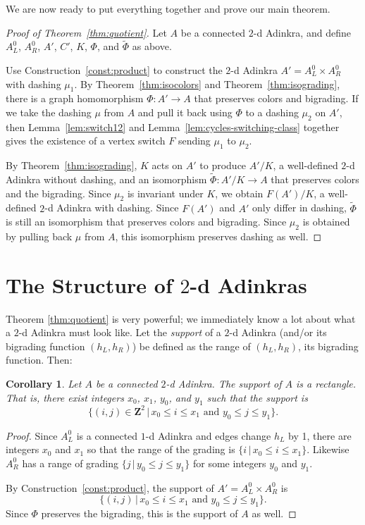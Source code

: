 \documentclass[12pt,twoside,singlespace]{article}
\numberwithin{equation}{section}
\newtheorem{cor}[equation]{Corollary}
\theoremstyle{definition}
\newcommand{\ZZ}{\mathbf{Z}}
\begin{document}
We are now ready to put everything together and prove our main theorem.

\begin{proof}[Proof of Theorem~\ref{thm:quotient}]
Let $A$ be a connected $2$-d Adinkra, and define $A_L^0$, $A_R^0$, $A'$, $C'$, $K$, $\Phi$, and $\tilde{\Phi}$ as above.

Use Construction~\ref{const:product} to construct the $2$-d Adinkra $A'=A_L^0\times A_R^0$ with dashing $\mu_1$.
By Theorem~\ref{thm:isocolors} and Theorem~\ref{thm:isograding}, there is a graph homomorphism $\Phi:A' \to A$ that preserves colors and bigrading.  If we take the dashing $\mu$ from $A$ and pull it back using $\Phi$ to a dashing $\mu_2$ on $A'$, then Lemma~\ref{lem:switch12} and Lemma~\ref{lem:cycles-switching-class} together gives the existence of a vertex switch $F$ sending $\mu_1$ to $\mu_2$.

By Theorem~\ref{thm:isograding}, $K$ acts on $A'$ to produce $A'/K$, a well-defined $2$-d Adinkra without dashing, and an isomorphism $\tilde{\Phi}:A'/K\to A$ that preserves colors and the bigrading.  Since $\mu_2$ is invariant under $K$, we obtain  $F(A')/K$, a well-defined $2$-d Adinkra with dashing. Since $F(A')$ and $A'$ only differ in dashing, $\tilde{\Phi}$ is still an isomorphism that preserves colors and bigrading.  Since $\mu_2$ is obtained by pulling back $\mu$ from $A$, this isomorphism preserves dashing as well.
\end{proof}

\section{The Structure of $2$-d Adinkras}
\label{sec:structure}
Theorem \ref{thm:quotient} is very powerful; we immediately know a lot about what a $2$-d Adinkra must look like. Let the \emph{support} of a $2$-d Adinkra (and/or its bigrading function $(h_L,h_R)$) be defined as the range of $(h_L,h_R)$, its bigrading function. Then:
\begin{cor}
\label{cor:rectangle}
Let $A$ be a connected $2$-d Adinkra.  The support of $A$ is a rectangle.  That is, there exist integers $x_0$, $x_1$, $y_0$, and $y_1$ such that the support is
\[\{(i,j)\in\ZZ^2\,|\,x_0 \le i\le x_1\mbox{ and }y_0\le j\le y_1\}.\]
\end{cor}
\begin{proof}
Since $A_L^0$ is a connected $1$-d Adinkra and edges change $h_L$ by 1, there are integers $x_0$ and $x_1$ so that the range of the grading is $\{i\,|\,x_0\le i\le x_1\}$.  Likewise $A_R^0$ has a range of grading $\{j\,|\,y_0\le j\le y_1\}$ for some integers $y_0$ and $y_1$.

By Construction~\ref{const:product}, the support of $A'=A_L^0\times A_R^0$ is
\[\{(i,j)\,|\,x_0\le i\le x_1\mbox{ and }y_0\le j\le y_1\}.\]
Since $\Phi$ preserves the bigrading, this is the support of $A$ as well.
\end{proof}
\end{document}
